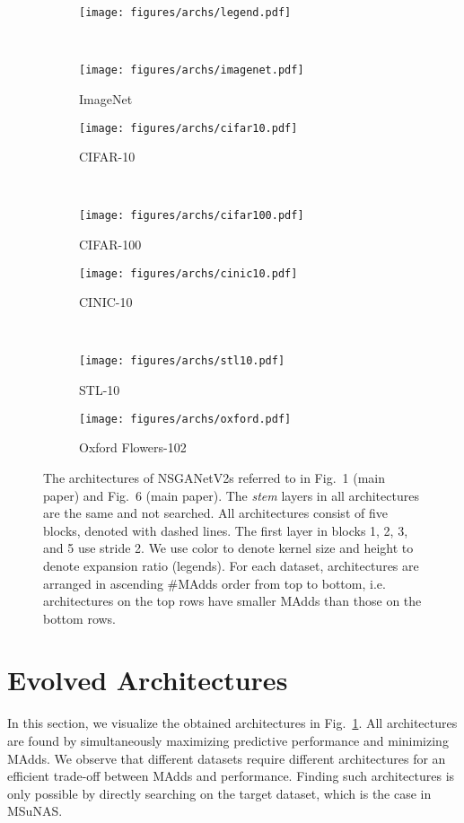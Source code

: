 \documentclass[runningheads]{llncs}
\def\ourmethod{MSuNAS}
\def\ourmodel{NSGANetV2}
\begin{document}
\begin{figure}[!h]
    \centering
    \begin{subfigure}{0.65\textwidth}
    \centering
    \texttt{[image: figures/archs/legend.pdf]}
    \end{subfigure}\\ \vspace{3mm}
    \begin{subfigure}{0.48\textwidth}
    \centering
    \texttt{[image: figures/archs/imagenet.pdf]}
    \caption{ImageNet}
    \end{subfigure}\hfill
    \begin{subfigure}{0.48\textwidth}
    \centering
    \texttt{[image: figures/archs/cifar10.pdf]}
    \caption{CIFAR-10}
    \end{subfigure}\\
    \begin{subfigure}{0.48\textwidth}
    \centering
    \texttt{[image: figures/archs/cifar100.pdf]}
    \caption{CIFAR-100}
    \end{subfigure}\hfill
    \begin{subfigure}{0.48\textwidth}
    \centering
    \texttt{[image: figures/archs/cinic10.pdf]}
    \caption{CINIC-10}
    \end{subfigure}\\
    \begin{subfigure}{0.48\textwidth}
    \centering
    \texttt{[image: figures/archs/stl10.pdf]}
    \caption{STL-10}
    \end{subfigure}\hfill
    \begin{subfigure}{0.48\textwidth}
    \centering
    \texttt{[image: figures/archs/oxford.pdf]}
    \caption{Oxford Flowers-102}
    \end{subfigure}
    \caption{The architectures of \ourmodel{}s referred to in Fig.~1 (main paper) and Fig.~6 (main paper). The \emph{stem} layers in all architectures are the same and not searched. All architectures consist of five blocks, denoted with dashed lines. The first layer in blocks 1, 2, 3, and 5 use stride 2. We use color to denote kernel size and height to denote expansion ratio (legends). For each dataset, architectures are arranged in ascending \#MAdds order from top to bottom, i.e. architectures on the top rows have smaller MAdds than those on the bottom rows.
    \label{fig:archs}}
\end{figure}

\section{Evolved Architectures\label{sec:arch}}
In this section, we visualize the obtained architectures in Fig.~\ref{fig:archs}. All architectures are found by simultaneously maximizing predictive performance and minimizing MAdds. We observe that different datasets require different architectures for an efficient trade-off between MAdds and performance. Finding such architectures is only possible by directly searching on the target dataset, which is the case in \ourmethod{}.
 
\end{document}
